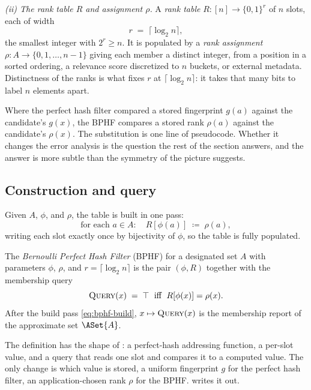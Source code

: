 \smallskip
\noindent\emph{(ii) The rank table $R$ and assignment $\rho$.} A
\emph{rank table} $R : [n] \to \{0, 1\}^r$ of $n$ slots, each of width
\begin{equation}
\label{eq:bphf-r}
  r \;=\; \lceil \log_2 n \rceil,
\end{equation}
the smallest integer with $2^r \ge n$. It is populated by a \emph{rank
assignment} $\rho : A \to \{0, 1, \ldots, n-1\}$ giving each member a
distinct integer, from a position in a sorted ordering, a relevance
score discretized to $n$ buckets, or external metadata. Distinctness of
the ranks is what fixes $r$ at $\lceil \log_2 n \rceil$: it takes that
many bits to label $n$ elements apart.

Where the perfect hash filter compared a stored fingerprint $g(a)$
against the candidate's $g(x)$, the BPHF compares a stored rank $\rho(a)$ against the
candidate's $\rho(x)$. The substitution is one line of pseudocode.
Whether it changes the error analysis is the question the rest of the
section answers, and the answer is more subtle than the symmetry of the
picture suggests.

\subsection*{Construction and query}

Given $A$, $\phi$, and $\rho$, the table is built in one pass:
\begin{equation}
\label{eq:bphf-build}
  \text{for each } a \in A: \quad R[\phi(a)] \;\coloneqq\; \rho(a),
\end{equation}
writing each slot exactly once by bijectivity of $\phi$, so the table is
fully populated.

\begin{definition}
\label{def:bphf}
The \emph{Bernoulli Perfect Hash Filter} (BPHF) for a designated set $A$
with parameters $\phi$, $\rho$, and $r = \lceil \log_2 n \rceil$ is the
pair $(\phi, R)$ together with the membership query
\[
  \textsc{Query}(x) \;=\; \top \;\text{ iff }\; R[\phi(x)] = \rho(x).
\]
After the build pass \eqref{eq:bphf-build}, $x \mapsto \textsc{Query}(x)$
is the membership report of the approximate set $\ASet{A}$.
\end{definition}

The definition has the shape of : a perfect-hash
addressing function, a per-slot value, and a query that reads one slot
and compares it to a computed value. The only change is which value is
stored, a uniform fingerprint $g$ for the perfect hash filter, an
application-chosen rank $\rho$ for the BPHF.  writes it out.

